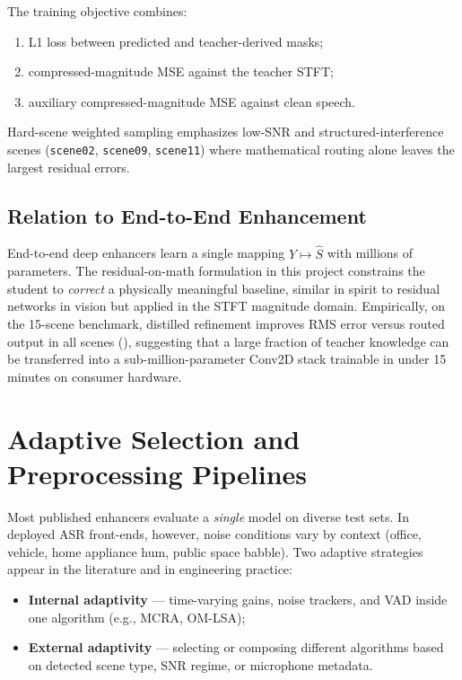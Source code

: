 The training objective combines:
\begin{enumerate}
  \item L1 loss between predicted and teacher-derived masks;
  \item compressed-magnitude MSE against the teacher STFT;
  \item auxiliary compressed-magnitude MSE against clean speech.
\end{enumerate}
Hard-scene weighted sampling emphasizes low-SNR and structured-interference scenes (\texttt{scene02}, \texttt{scene09}, \texttt{scene11}) where mathematical routing alone leaves the largest residual errors.

\subsection{Relation to End-to-End Enhancement}

End-to-end deep enhancers learn a single mapping $Y \mapsto \hat{S}$ with millions of parameters. The residual-on-math formulation in this project constrains the student to \emph{correct} a physically meaningful baseline, similar in spirit to residual networks in vision but applied in the STFT magnitude domain. Empirically, on the 15-scene benchmark, distilled refinement improves RMS error versus routed output in all scenes (), suggesting that a large fraction of teacher knowledge can be transferred into a sub-million-parameter Conv2D stack trainable in under 15 minutes on consumer hardware.

\section{Adaptive Selection and Preprocessing Pipelines}
\label{sec:adaptive_selection}

Most published enhancers evaluate a \emph{single} model on diverse test sets. In deployed ASR front-ends, however, noise conditions vary by context (office, vehicle, home appliance hum, public space babble). Two adaptive strategies appear in the literature and in engineering practice:

\begin{itemize}
  \item \textbf{Internal adaptivity} --- time-varying gains, noise trackers, and VAD inside one algorithm (e.g., MCRA, OM-LSA);
  \item \textbf{External adaptivity} --- selecting or composing different algorithms based on detected scene type, SNR regime, or microphone metadata.
\end{itemize}


